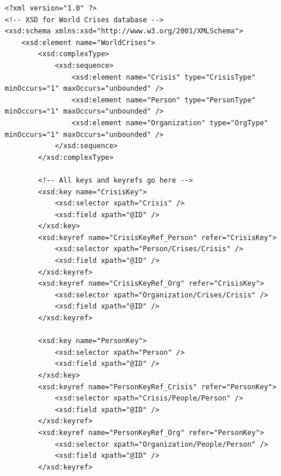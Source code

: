 \documentclass[12pt]{report}
\begin{document}
\begin{lstlisting}
<?xml version="1.0" ?>
<!-- XSD for World Crises database -->
<xsd:schema xmlns:xsd="http://www.w3.org/2001/XMLSchema">
    <xsd:element name="WorldCrises">
        <xsd:complexType>
            <xsd:sequence>
                <xsd:element name="Crisis" type="CrisisType" minOccurs="1" maxOccurs="unbounded" />
                <xsd:element name="Person" type="PersonType" minOccurs="1" maxOccurs="unbounded" />
                <xsd:element name="Organization" type="OrgType" minOccurs="1" maxOccurs="unbounded" />
            </xsd:sequence>
        </xsd:complexType>
        
        <!-- All keys and keyrefs go here -->
        <xsd:key name="CrisisKey">
            <xsd:selector xpath="Crisis" />
            <xsd:field xpath="@ID" />
        </xsd:key>
        <xsd:keyref name="CrisisKeyRef_Person" refer="CrisisKey">
            <xsd:selector xpath="Person/Crises/Crisis" />
            <xsd:field xpath="@ID" />
        </xsd:keyref>
        <xsd:keyref name="CrisisKeyRef_Org" refer="CrisisKey">
            <xsd:selector xpath="Organization/Crises/Crisis" />
            <xsd:field xpath="@ID" />
        </xsd:keyref>
        
        <xsd:key name="PersonKey">
            <xsd:selector xpath="Person" />
            <xsd:field xpath="@ID" />
        </xsd:key>
        <xsd:keyref name="PersonKeyRef_Crisis" refer="PersonKey">
            <xsd:selector xpath="Crisis/People/Person" />
            <xsd:field xpath="@ID" />
        </xsd:keyref>
        <xsd:keyref name="PersonKeyRef_Org" refer="PersonKey">
            <xsd:selector xpath="Organization/People/Person" />
            <xsd:field xpath="@ID" />
        </xsd:keyref>
        

\end{lstlisting}
\end{document}
